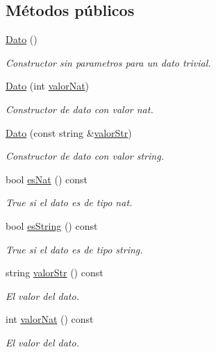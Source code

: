 \subsection*{Métodos públicos}
\begin{DoxyCompactItemize}
\item 
\hyperlink{classDato_a008b1dadda8ec2557cc88886da907523}{Dato} ()
\begin{DoxyCompactList}\small\item\em Constructor sin parametros para un dato trivial. \end{DoxyCompactList}\item 
\hyperlink{classDato_aeb115751623b17f5cc61199c45dd6fb4}{Dato} (int \hyperlink{classDato_a417fa8d0766c8ac1221c553b0f31ba93}{valor\-Nat})
\begin{DoxyCompactList}\small\item\em Constructor de dato con valor nat. \end{DoxyCompactList}\item 
\hyperlink{classDato_a3b8e8b3472eee6374487378e865e3428}{Dato} (const string \&\hyperlink{classDato_ac1ece791ad4cc21764a89ffac254add8}{valor\-Str})
\begin{DoxyCompactList}\small\item\em Constructor de dato con valor string. \end{DoxyCompactList}\item 
bool \hyperlink{classDato_a815f643cd190da9ddf25e1c91d0eb7fa}{es\-Nat} () const 
\begin{DoxyCompactList}\small\item\em True si el dato es de tipo nat. \end{DoxyCompactList}\item 
bool \hyperlink{classDato_a25bc3327023f6d84729d64d61800937b}{es\-String} () const 
\begin{DoxyCompactList}\small\item\em True si el dato es de tipo string. \end{DoxyCompactList}\item 
string \hyperlink{classDato_ac1ece791ad4cc21764a89ffac254add8}{valor\-Str} () const 
\begin{DoxyCompactList}\small\item\em El valor del dato. \end{DoxyCompactList}\item 
int \hyperlink{classDato_a417fa8d0766c8ac1221c553b0f31ba93}{valor\-Nat} () const 
\begin{DoxyCompactList}\small\item\em El valor del dato. \end{DoxyCompactList}\end{DoxyCompactItemize}
